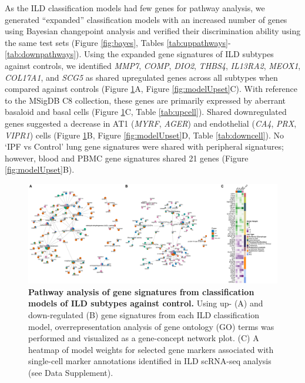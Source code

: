 \documentclass[
]{article}
\begin{document}
As the ILD classification models had few genes for pathway analysis, we generated ``expanded'' classification models with an increased number of genes using Bayesian changepoint analysis and verified their discrimination ability using the same test sets (Figure \ref{fig:bayes}, Tables \ref{tab:uppathways}-\ref{tab:downpathways}). Using the expanded gene signatures of ILD subtypes against controls, we identified \textit{MMP7}, \textit{COMP}, \textit{DIO2}, \textit{THBS4}, \textit{IL13RA2}, \textit{MEOX1}, \textit{COL17A1}, and \textit{SCG5} as shared upregulated genes across all subtypes when compared against controls (Figure \ref{fig:ILDpathways}A, Figure \ref{fig:modelUpset}C). With reference to the MSigDB C8 collection, these genes are primarily expressed by aberrant basaloid and basal cells (Figure \ref{fig:ILDpathways}C, Table \ref{tab:upcell}). Shared downregulated genes suggested a decrease in AT1 (\textit{MYRF}, \textit{AGER}) and endothelial (\textit{CA4}, \textit{PRX}, \textit{VIPR1}) cells (Figure \ref{fig:ILDpathways}B, Figure \ref{fig:modelUpset}D, Table \ref{tab:downcell}). No `IPF vs Control' lung gene signatures were shared with peripheral signatures; however, blood and PBMC gene signatures shared 21 genes (Figure \ref{fig:modelUpset}B).



\begin{figure}

{\centering \includegraphics[width=1\linewidth,]{./Figures/SysReview/Figure5_pathways} 

}

\caption[ILD pathways]{\textbf{Pathway analysis of gene signatures from classification models of ILD subtypes against control.} Using up- (A) and down-regulated (B) gene signatures from each ILD classification model, overrepresentation analysis of gene ontology (GO) terms was performed and visualized as a gene-concept network plot. (C) A heatmap of model weights for selected gene markers associated with single-cell marker annotations identified in ILD scRNA-seq analysis (see Data Supplement).}\label{fig:ILDpathways}
\end{figure}
\end{document}
